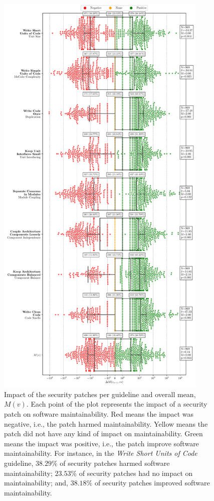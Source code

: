 \documentclass[smallextended]{svjour3}       %
\begin{document}
 \begin{figure}[htp]
     \begin{adjustwidth}{-1cm}{-1cm}  
  	\centering
  	\includegraphics[width=0.9\textwidth]{figures/main_per_guideline.pdf}
    \end{adjustwidth}
	
  	\caption{Impact of the security patches per guideline and overall mean, $M(v)$. 
    Each point of the plot represents the impact of a security patch on software 
    maintainability. Red means the impact was negative, i.e., the patch 
    harmed maintainability. Yellow means the patch did not have any 
    kind of impact on maintainability. Green means the impact was 
    positive, i.e., the patch improve software maintainability. For instance, in the 
    \emph{Write Short Units of Code} guideline, $38.29\%$ of 
    security patches harmed software maintainability; $23.53\%$ of 
    security patches had no impact on maintainability; and, 
    $38.18\%$ of security patches improved software maintainability.}
 	\label{fig:guidelines}	
 \end{figure}
 
\end{document}
